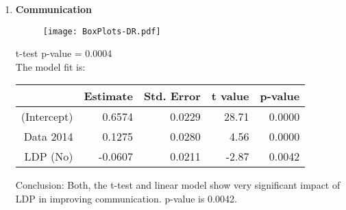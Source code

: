 \documentclass[11pt]{extarticle} %
\begin{document}
\begin{enumerate}
\item {\bf{Communication}}\\
\begin{minipage}[t]{0.3\textwidth}
\begin{figure}[H]
\centering 
\texttt{[image: BoxPlots-DR.pdf]}
\end{figure}
\end{minipage}
\begin{minipage}[t]{0.6\textwidth}
\vspace{0.8cm}
t-test p-value = 0.0004 \\
The model fit is:
\begin{table}[H]
\centering
\begin{tabular}{rrrrr}
  \hline
 & Estimate & Std. Error & t value & p-value \\ 
  \hline
(Intercept) & 0.6574 & 0.0229 & 28.71 & 0.0000 \\ 
  Data 2014 & 0.1275 & 0.0280 & 4.56 & 0.0000 \\ 
  LDP (No) & -0.0607 & 0.0211 & -2.87 & 0.0042 \\ 
   \hline
\end{tabular}
\end{table}
Conclusion: Both, the t-test and linear model show very significant impact of LDP in improving communication. p-value is 0.0042. 
\end{minipage}
\end{enumerate}
\end{document}
